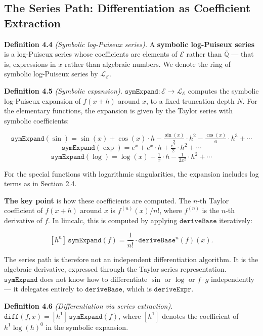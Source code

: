 \documentclass[12pt]{article}
\begin{document}
\subsection{The Series Path: Differentiation as Coefficient
Extraction}\label{the-series-path-differentiation-as-coefficient-extraction}

\textbf{Definition 4.4} \emph{(Symbolic log-Puiseux series).} A
\textbf{symbolic log-Puiseux series} is a log-Puiseux series whose
coefficients are elements of \(\mathcal{E}\) rather than
\(\bar{\mathbb{Q}}\) --- that is, expressions in \(x\) rather than
algebraic numbers. We denote the ring of symbolic log-Puiseux series by
\(\mathcal{L}_{\mathcal{E}}\).

\textbf{Definition 4.5} \emph{(Symbolic expansion).}
\(\mathtt{symExpand} : \mathcal{E} \to \mathcal{L}_{\mathcal{E}}\)
computes the symbolic log-Puiseux expansion of \(f(x+h)\) around \(x\),
to a fixed truncation depth \(N\). For the elementary functions, the
expansion is given by the Taylor series with symbolic coefficients:

\[\mathtt{symExpand}(\sin) = \sin(x) + \cos(x) \cdot h - \tfrac{\sin(x)}{2} \cdot h^2 - \tfrac{\cos(x)}{6} \cdot h^3 + \cdots\]
\[\mathtt{symExpand}(\exp) = e^x + e^x \cdot h + \tfrac{e^x}{2} \cdot h^2 + \cdots\]
\[\mathtt{symExpand}(\log) = \log(x) + \tfrac{1}{x} \cdot h - \tfrac{1}{2x^2} \cdot h^2 + \cdots\]

For the special functions with logarithmic singularities, the expansion
includes log terms as in Section 2.4.

\textbf{The key point} is how these coefficients are computed. The
\(n\)-th Taylor coefficient of \(f(x+h)\) around \(x\) is
\(f^{(n)}(x)/n!\), where \(f^{(n)}\) is the \(n\)-th derivative of
\(f\). In limcalc, this is computed by applying \(\mathtt{deriveBase}\)
iteratively:

\[[h^n] \,\mathtt{symExpand}(f) = \frac{1}{n!} \cdot \mathtt{deriveBase}^n(f)(x).\]

The series path is therefore not an independent differentiation
algorithm. It is the algebraic derivative, expressed through the Taylor
series representation. \(\mathtt{symExpand}\) does not know how to
differentiate \(\sin\) or \(\log\) or \(f \cdot g\) independently --- it
delegates entirely to \(\mathtt{deriveBase}\), which is
\(\mathtt{deriveExpr}\).

\textbf{Definition 4.6} \emph{(Differentiation via series extraction).}
\(\mathtt{diff}(f, x) = [h^1]\,\mathtt{symExpand}(f)\), where \([h^1]\)
denotes the coefficient of \(h^1 \log(h)^0\) in the symbolic expansion.
\end{document}
